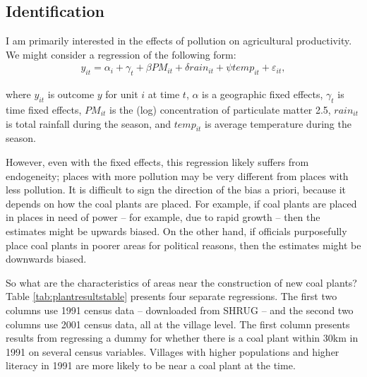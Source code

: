 \documentclass[
]{article}
\begin{document}
\hypertarget{identification}{%
\subsection{Identification}\label{identification}}

\label{identification}

I am primarily interested in the effects of pollution on agricultural productivity. We might consider a regression of the following form:
\begin{gather} y_{it} = \alpha_{i} + \gamma_{t} + \beta PM_{it} + \delta rain_{it} + \psi temp_{it} + \varepsilon_{it}, \end{gather}

where \(y_{it}\) is outcome \(y\) for unit \(i\) at time \(t\), \(\alpha\) is a geographic fixed effects, \(\gamma_t\) is time fixed effects, \(PM_{it}\) is the (log) concentration of particulate matter 2.5, \(rain_{it}\) is total rainfall during the season, and \(temp_{it}\) is average temperature during the season.

However, even with the fixed effects, this regression likely suffers from endogeneity; places with more pollution may be very different from places with less pollution. It is difficult to sign the direction of the bias a priori, because it depends on how the coal plants are placed. For example, if coal plants are placed in places in need of power -- for example, due to rapid growth -- then the estimates might be upwards biased. On the other hand, if officials purposefully place coal plants in poorer areas for political reasons, then the estimates might be downwards biased.

So what are the characteristics of areas near the construction of new coal plants? Table \ref{tab:plantresultstable} presents four separate regressions. The first two columns use 1991 census data -- downloaded from SHRUG -- and the second two columns use 2001 census data, all at the village level. The first column presents results from regressing a dummy for whether there is a coal plant within 30km in 1991 on several census variables. Villages with higher populations and higher literacy in 1991 are more likely to be near a coal plant at the time.
\end{document}
